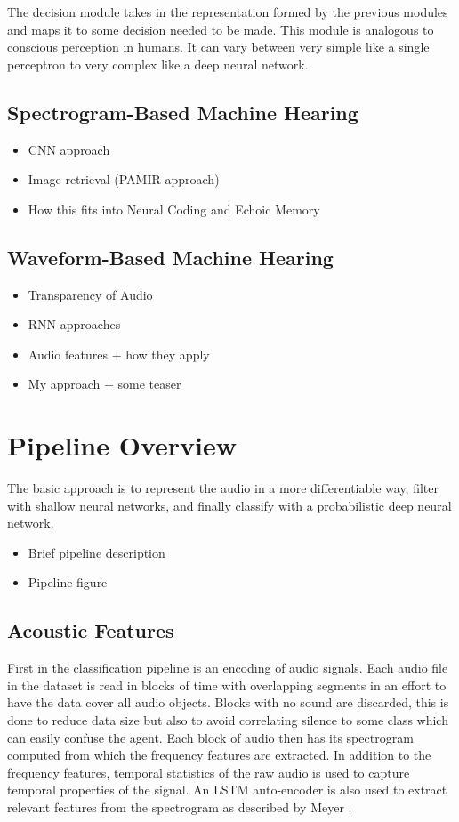 The decision module takes in the representation formed by the previous modules and maps it to some decision needed to be made. This module is analogous to conscious perception in humans. It can vary between very simple like a single perceptron to very complex like a deep neural network.

\subsection{Spectrogram-Based Machine Hearing}
\begin{itemize}
    \item CNN approach
    \item Image retrieval (PAMIR approach)
    \item How this fits into Neural Coding and Echoic Memory
\end{itemize}

\subsection{Waveform-Based Machine Hearing}
\begin{itemize}
    \item Transparency of Audio
    \item RNN approaches
    \item Audio features + how they apply
    \item My approach + some teaser
\end{itemize}

\section{Pipeline Overview}
The basic approach is to represent the audio in a more differentiable way, filter with shallow neural networks, and finally classify with a probabilistic deep neural network.

\begin{itemize}
    \item Brief pipeline description
    \item Pipeline figure
\end{itemize}

\subsection{Acoustic Features}
First in the classification pipeline is an encoding of audio signals. Each audio file in the dataset is read in blocks of time with overlapping segments in an effort to have the data cover all audio objects. Blocks with no sound are discarded, this is done to reduce data size but also to avoid correlating silence to some class which can easily confuse the agent. Each block of audio then has its spectrogram computed from which the frequency features are extracted. In addition to the frequency features, temporal statistics of the raw audio is used to capture temporal properties of the signal. An LSTM auto-encoder is also used to extract relevant features from the spectrogram as described by Meyer \cite{Meyer2017}.

